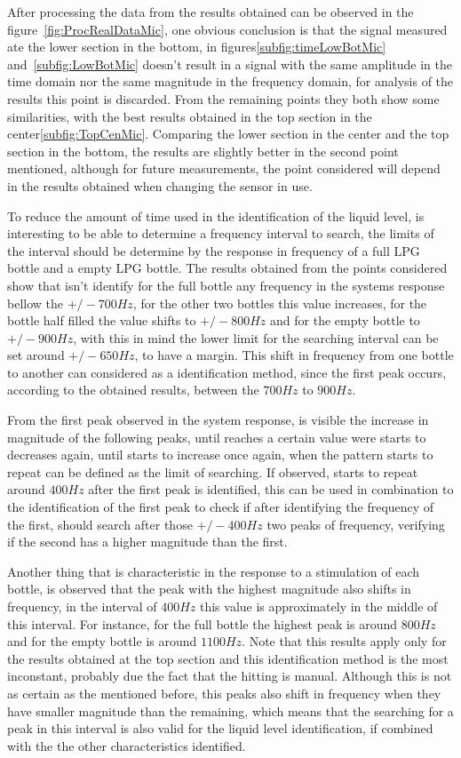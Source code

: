 After processing the data from the results obtained can be observed in the figure~\ref{fig:ProcRealDataMic}, one obvious conclusion is that the signal measured ate the lower section in the bottom, in figures\ref{subfig:timeLowBotMic} and~\ref{subfig:LowBotMic} doesn't result in a signal with the same amplitude in the time domain nor the same magnitude in the frequency domain, for analysis of the results this point is discarded. From the remaining points they both show some similarities, with the best results obtained in the top section in the center\ref{subfig:TopCenMic}. Comparing the lower section in the center and the top section in the bottom, the results are slightly better in the second point mentioned, although for future measurements, the point considered will depend in the results obtained when changing the sensor in use.

To reduce the amount of time used in the identification of the liquid level, is interesting to be able to determine a frequency interval to search, the limits of the interval should be determine by the response in frequency of a full LPG bottle and a empty LPG bottle. The results obtained from the points considered show that isn't identify for the full bottle any frequency in the systems response bellow the $+/-700Hz$, for the other two bottles this value increases, for the bottle half filled the value shifts to $+/-800Hz$ and for the empty bottle to $+/-900Hz$, with this in mind the lower limit for the searching interval can be set around $+/-650Hz$, to have a margin. This shift in frequency from one bottle to another can considered as a identification method, since the first peak occurs, according to the obtained results, between the $700Hz$ to $900Hz$. 

From the first peak observed in the system response, is visible the increase in magnitude of the following peaks, until reaches a certain value were starts to decreases again, until starts to increase once again, when the pattern starts to repeat can be defined as the limit of searching. If observed, starts to repeat around $400Hz$ after the first peak is identified, this can be used in combination to the identification of the first peak to check if after identifying the frequency of the first, should search after those $+/-400Hz$ two peaks of frequency, verifying if the second has a higher magnitude than the first. 

Another thing that is characteristic in the response to a stimulation of each bottle, is observed that the peak with the highest magnitude also shifts in frequency, in the interval of $400Hz$ this value is approximately in the middle of this interval. For instance, for the full bottle the highest peak is around $800Hz$ and for the empty bottle is around $1100Hz$. Note that this results apply only for the results obtained at the top section and this identification method is the most inconstant, probably due the fact that the hitting is manual. Although this is not as certain as the mentioned before, this peaks also shift in frequency when they have smaller magnitude than the remaining, which means that the searching for a peak in this interval is also valid for the liquid level identification, if combined with the the other characteristics identified.

